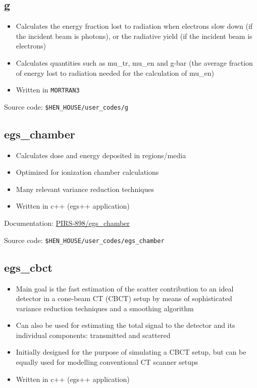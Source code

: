 \documentclass[12pt,twoside]{article}
\begin{document}
\clearpage
\subsection{g}
\begin{itemize}
\item Calculates the energy fraction lost to radiation when electrons slow down (if the incident beam is photons), or the radiative yield (if the incident beam is electrons)
\item Calculates quantities such as mu\_tr, mu\_en and g-bar (the average fraction of energy lost to radiation needed for the calculation of mu\_en)
\item Written in \Verb+MORTRAN3+
\end{itemize}

Source code: \Verb+$HEN_HOUSE/user_codes/g+

\subsection{egs\_chamber}
\begin{itemize}
\item Calculates dose and energy deposited in regions/media
\item Optimized for ionization chamber calculations
\item Many relevant variance reduction techniques
\item Written in c++ (egs++ application)
\end{itemize}

Documentation: \href{http://nrc-cnrc.github.io/EGSnrc/doc/pirs898/egs\_chamber.html}{PIRS-898/egs\_chamber}

Source code: \Verb+$HEN_HOUSE/user_codes/egs_chamber+

\subsection{egs\_cbct}
\begin{itemize}
\item Main goal is the fast estimation of the scatter contribution to an ideal detector in a cone-beam CT (CBCT) setup by means of sophisticated variance reduction techniques and a smoothing algorithm
\item Can also be used for estimating the total signal to the detector and its individual components: transmitted and scattered
\item Initially designed for the purpose of simulating a CBCT setup, but can be equally used for modelling conventional CT scanner setups
\item Written in c++ (egs++ application)
\end{itemize}
\end{document}
